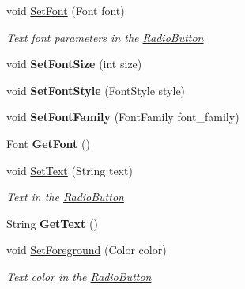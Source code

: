 \begin{DoxyCompactItemize}
void \mbox{\hyperlink{class_space_v_i_l_1_1_radio_button_a58468eb198714c58266c4a88cb856ebe}{Set\+Font}} (Font font)
\begin{DoxyCompactList}\small\item\em Text font parameters in the \mbox{\hyperlink{class_space_v_i_l_1_1_radio_button}{Radio\+Button}} \end{DoxyCompactList}\item 
\mbox{\label{class_space_v_i_l_1_1_radio_button_a0ee4708e5417674ff32f8dee2852402e}} 
void {\bfseries Set\+Font\+Size} (int size)
\item 
\mbox{\label{class_space_v_i_l_1_1_radio_button_ad19bafe439bd01ba5d7e3632c9217aa5}} 
void {\bfseries Set\+Font\+Style} (Font\+Style style)
\item 
\mbox{\label{class_space_v_i_l_1_1_radio_button_a4f3553687c51ab7b7c9872f6cdd9bfb2}} 
void {\bfseries Set\+Font\+Family} (Font\+Family font\+\_\+family)
\item 
\mbox{\label{class_space_v_i_l_1_1_radio_button_ac43491b9c80047a7d75c779e304aa786}} 
Font {\bfseries Get\+Font} ()
\item 
void \mbox{\hyperlink{class_space_v_i_l_1_1_radio_button_a2759a336ec7d6f94e15163498eb5f5f8}{Set\+Text}} (String text)
\begin{DoxyCompactList}\small\item\em Text in the \mbox{\hyperlink{class_space_v_i_l_1_1_radio_button}{Radio\+Button}} \end{DoxyCompactList}\item 
\mbox{\label{class_space_v_i_l_1_1_radio_button_a93541fce8d065cb8a4735274d010742a}} 
String {\bfseries Get\+Text} ()
\item 
void \mbox{\hyperlink{class_space_v_i_l_1_1_radio_button_a473085ed46d316aab157cd78d495f053}{Set\+Foreground}} (Color color)
\begin{DoxyCompactList}\small\item\em Text color in the \mbox{\hyperlink{class_space_v_i_l_1_1_radio_button}{Radio\+Button}} \end{DoxyCompactList}\item 
\mbox{\label{class_space_v_i_l_1_1_radio_button_ac41c7146717b7e6629fb04773016baf6}} 

\end{DoxyCompactItemize}
